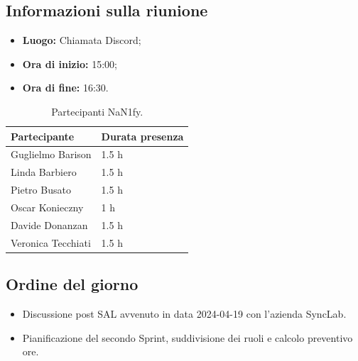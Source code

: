 \documentclass[8pt]{article}
\begin{document}
\subsection{Informazioni sulla riunione}
\begin{itemize}
	\setlength\itemsep{0em}
	\item\textbf{Luogo:} Chiamata Discord;
	\item\textbf{Ora di inizio:} 15:00;
	\item\textbf{Ora di fine:}  16:30.
\end{itemize}
\begin{table}[ht!]
	\begin{minipage}[t]{0.5\linewidth}
		\centering
		\begin{tabular}{p{3cm} p{3cm}}
			\toprule
			\textbf{Partecipante} & \textbf{Durata presenza} \\
			\midrule
			Guglielmo Barison & 1.5 h \\
			Linda Barbiero &  1.5 h \\
			Pietro Busato & 1.5 h \\
			Oscar Konieczny & 1 h \\
			Davide Donanzan & 1.5 h \\
			Veronica Tecchiati & 1.5 h \\
			\bottomrule
		\end{tabular}
		\caption{Partecipanti NaN1fy.}
		\label{table:Partecipanti NaN1fy}
	\end{minipage}
\end{table}
\subsection{Ordine del giorno}
\begin{itemize}
	\setlength\itemsep{0em}
	\item Discussione post SAL avvenuto in data 2024-04-19 con l'azienda SyncLab.
	\item Pianificazione del secondo Sprint, suddivisione dei ruoli e calcolo preventivo ore.
\end{itemize}
\end{document}
